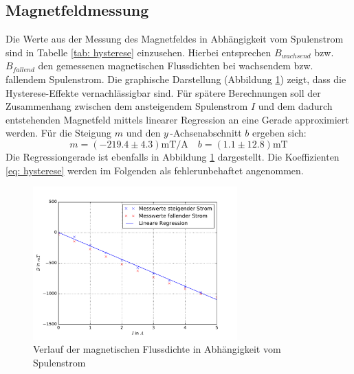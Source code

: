 \subsection{Magnetfeldmessung}
Die Werte aus der Messung des Magnetfeldes in Abhängigkeit vom Spulenstrom sind in Tabelle \ref{tab: hysterese} einzusehen.
Hierbei entsprechen $B_{wachsend}$ bzw. $B_{fallend}$ den gemessenen magnetischen Flussdichten bei wachsendem
bzw. fallendem Spulenstrom.
Die graphische Darstellung (Abbildung \ref{fig: hysterese}) zeigt, dass die Hysterese-Effekte vernachlässigbar sind. Für
spätere Berechnungen soll der Zusammenhang zwischen dem ansteigendem Spulenstrom $I$ und dem dadurch entstehenden
Magnetfeld mittels linearer Regression an eine Gerade approximiert werden. Für die Steigung $m$ und den $y\,$-Achsenabschnitt $b$ ergeben sich:
\begin{equation}
  m = (-219.4 \pm 4.3) \si{\milli\tesla \per \ampere} \quad b =  (1.1 \pm 12.8) \si{\milli\tesla}%
  \label{eq: hysterese}
\end{equation}
Die Regressiongerade ist ebenfalls in Abbildung \ref{fig: hysterese} dargestellt. Die Koeffizienten \eqref{eq: hysterese} werden im Folgenden
als fehlerunbehaftet angenommen.
  \centering
\begin{figure}
  \includegraphics[width=0.7\textwidth]{pics/hysterese.pdf}
  \caption{Verlauf der magnetischen Flussdichte in Abhängigkeit vom Spulenstrom}
  \label{fig: hysterese}
\end{figure}




